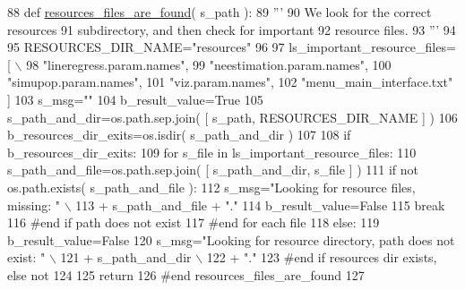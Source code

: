 \begin{DoxyCode}
88 \textcolor{keyword}{def }\hyperlink{namespacenegui_1_1setup__negui__environment_a6fe75d5a25f049e0922770c01800bf0f}{resources\_files\_are\_found}( s\_path ):
89     \textcolor{stringliteral}{'''}
90 \textcolor{stringliteral}{    We look for the correct resources }
91 \textcolor{stringliteral}{    subdirectory, and then check for important}
92 \textcolor{stringliteral}{    resource files.}
93 \textcolor{stringliteral}{    '''}
94 
95     RESOURCES\_DIR\_NAME=\textcolor{stringliteral}{"resources"}
96 
97     ls\_important\_resource\_files=[ \(\backslash\)
98                 \textcolor{stringliteral}{"lineregress.param.names"},
99                 \textcolor{stringliteral}{"neestimation.param.names"},
100                 \textcolor{stringliteral}{"simupop.param.names"},
101                 \textcolor{stringliteral}{"viz.param.names"},
102                 \textcolor{stringliteral}{"menu\_main\_interface.txt"} ]
103     s\_msg=\textcolor{stringliteral}{""}
104     b\_result\_value=\textcolor{keyword}{True}
105     s\_path\_and\_dir=os.path.sep.join( [ s\_path, RESOURCES\_DIR\_NAME ] )   
106     b\_resources\_dir\_exits=os.isdir( s\_path\_and\_dir )
107 
108     \textcolor{keywordflow}{if} b\_resources\_dir\_exits:
109         \textcolor{keywordflow}{for} s\_file \textcolor{keywordflow}{in} ls\_important\_resource\_files:
110             s\_path\_and\_file=os.path.sep.join( [ s\_path\_and\_dir, s\_file ] )
111             \textcolor{keywordflow}{if} \textcolor{keywordflow}{not} os.path.exists( s\_path\_and\_file ):
112                 s\_msg=\textcolor{stringliteral}{"Looking for resource files, missing: "} \(\backslash\)
113                                                 + s\_path\_and\_file + \textcolor{stringliteral}{"."}
114                 b\_result\_value=\textcolor{keyword}{False}
115                 \textcolor{keywordflow}{break}
116             \textcolor{comment}{#end if path does not exist}
117         \textcolor{comment}{#end for each file}
118     \textcolor{keywordflow}{else}:
119         b\_result\_value=\textcolor{keyword}{False}
120         s\_msg=\textcolor{stringliteral}{"Looking for resource directory, path does not exist: "} \(\backslash\)
121                                                         + s\_path\_and\_dir \(\backslash\)
122                                                         + \textcolor{stringliteral}{"."}
123     \textcolor{comment}{#end if resources dir exists, else not}
124             
125     \textcolor{keywordflow}{return}
126 \textcolor{comment}{#end resources\_files\_are\_found}
127 
\end{DoxyCode}
